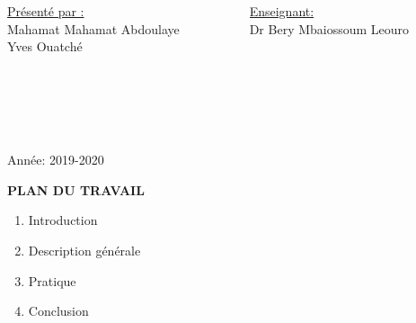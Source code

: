 \documentclass[11pt]{beamer}
\begin{document}

      \begin{columns}
\begin{column}{8cm}

  \scriptsize {
       {\underline {Présenté par :}\\Mahamat Mahamat Abdoulaye\\Yves Ouatché}}
 

 \end{column}
 

 \begin{column}{8cm}

  \scriptsize {
       {\underline {Enseignant:}\\ Dr Bery Mbaiossoum Leouro\\ \ \\ \ \\ \ \\ \ \\ \ \\
      }}
 

 \end{column}
 
  \end{columns}  

  

\vspace{-0.3cm}

\begin{center}
   \small {Année: 2019-2020}
   \normalsize

\end{center}



\begin{frame}{\textbf {PLAN DU TRAVAIL}}
 \begin{enumerate}
 \item Introduction
 \item Description générale
 \item Pratique
 \item Conclusion
 \end{enumerate}
	
 	
  \end{frame}
 
\end{document}
